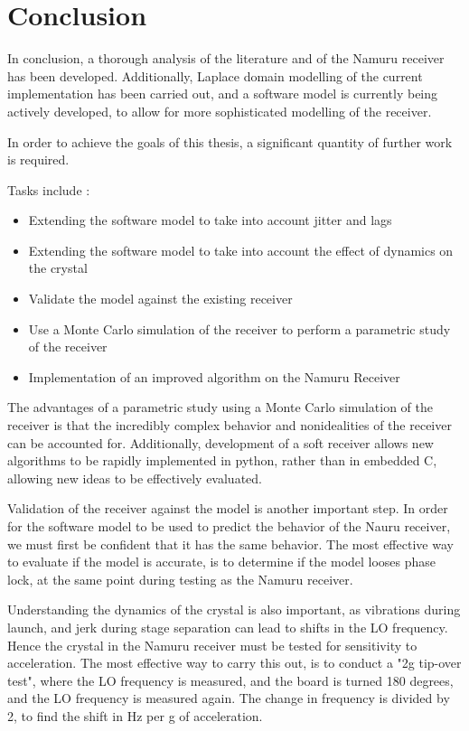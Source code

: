 \chapter{Conclusion}\label{ch:conclusion}

In conclusion, a thorough analysis of the literature and of the Namuru receiver has been developed. Additionally, Laplace domain modelling of the current implementation has been carried out, and a software model is currently being actively developed, to allow for more sophisticated modelling of the receiver. 


In order to achieve the goals of this thesis, a significant quantity of further work is required. 

Tasks include : 
\begin{itemize}
\item{Extending the software model to take into account jitter and lags}
\item{Extending the software model to take into account the effect of dynamics on the crystal}
\item{Validate the model against the existing receiver}
\item{Use a Monte Carlo simulation of the receiver to perform a parametric study of the receiver}
\item{Implementation of an improved algorithm on the Namuru Receiver}
\end{itemize}

The advantages of a parametric study using a Monte Carlo simulation of the receiver is that the incredibly complex behavior and nonidealities of the receiver can be accounted for. Additionally, development of a soft receiver allows new algorithms to be rapidly implemented in python, rather than in embedded C, allowing new ideas to be effectively evaluated. 

Validation of the receiver against the model is another important step. In order for the software model to be used to predict the behavior of the Nauru receiver, we must first be confident that it has the same behavior. The most effective way to evaluate if the model is accurate, is to determine if the model looses phase lock, at the same point during testing as the Namuru receiver. 

Understanding the dynamics of the crystal is also important, as vibrations during launch, and jerk during stage separation can lead to shifts in the \ac{LO} frequency. Hence the crystal in the Namuru receiver must be tested for sensitivity to acceleration. The most effective way to carry this out, is to conduct a "2g tip-over test", where the \ac{LO} frequency is measured, and the board is turned 180 degrees, and the \ac{LO} frequency is measured again. The change in frequency is divided by 2, to find the shift in Hz per g of acceleration. 


